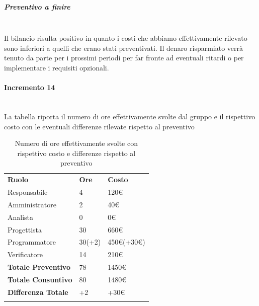 \subparagraph*{Preventivo a finire} \mbox{} \\
Il bilancio risulta positivo in quanto i costi che abbiamo effettivamente rilevato sono inferiori a quelli che erano stati preventivati. Il denaro risparmiato verrà tenuto da parte per i prossimi periodi per far fronte ad eventuali ritardi o per implementare i requisiti opzionali.


\paragraph*{Incremento 14} \mbox{} \\
La tabella riporta il numero di ore effettivamente svolte dal gruppo e il rispettivo costo con le eventuali differenze rilevate rispetto al preventivo
\begin{longtable} {							
		>{}p{40mm}  
		>{}p{20mm}	
		>{}p{28mm}			
	}			
	\rowcolor{gray!50}
	
	\textbf{Ruolo}            & \textbf{Ore} & \textbf{Costo}       \TBstrut \\
	Responsabile              & 4            & 120\euro             \TBstrut \\
	Amministratore            & 2            & 40\euro              \TBstrut \\
	Analista                  & 0            & 0\euro               \TBstrut \\
	Progettista               & 30           & 660\euro             \TBstrut \\
	Programmatore             & 30(+2)       & 450\euro(+30\euro)   \TBstrut \\
	Verificatore              & 14           & 210\euro             \TBstrut \\
	\textbf{Totale Preventivo}& 78           & 1450\euro            \TBstrut \\	
	\textbf{Totale Consuntivo}& 80           & 1480\euro            \TBstrut \\	
	\textbf{Differenza Totale}& +2           & +30\euro             \TBstrut \\
	\rowcolor{white}
	\caption{Numero di ore effettivamente svolte con rispettivo costo e differenze rispetto al preventivo}	
\end{longtable}

